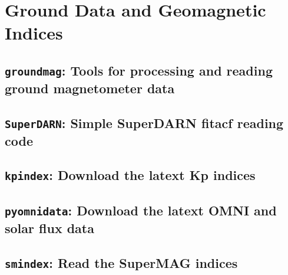 \chapter{Ground Data and Geomagnetic Indices}

	\section{\texttt{groundmag}: Tools for processing and reading ground magnetometer data}
	
	\section{\texttt{SuperDARN}: Simple SuperDARN fitacf reading code}

	\section{\texttt{kpindex}: Download the latext Kp indices}

	\section{\texttt{pyomnidata}: Download the latext OMNI and solar flux data}

	\section{\texttt{smindex}: Read the SuperMAG indices}




